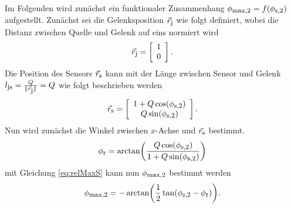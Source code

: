 Im Folgenden wird zunächst ein funktionaler Zusammenhang $\phi_{\textrm{\footnotesize{max,2}}} = f(\phi_{\textrm{\footnotesize{s,2}}})$ aufgestellt. Zunächst sei die Gelenksposition $\vec{r}_{\textrm{\footnotesize{j}}}$ wie folgt definiert, wobei die Distanz zwischen Quelle und Gelenk auf eins normiert wird 
	\begin{equation}
		\vec{r}_{\textrm{\footnotesize{j}}} = \left[\begin{array}{c} 1\\ 0 \end{array}\right] .
	\end{equation}
	Die Position des Sensors $\vec{r}_{\textrm{\footnotesize{s}}}$ kann mit der Länge zwischen Sensor und Gelenk $l_{\textrm{\footnotesize{js}}} = \frac{Q}{\|\vec{r}_{\textrm{\footnotesize{j}}}\|}=Q$ wie folgt beschrieben werden
	\begin{equation}
		\vec{r}_{\textrm{\footnotesize{s}}} = \left[\begin{array}{c} 1+Q\cos(\phi_{\textrm{\footnotesize{s,2}}})\\ Q\sin(\phi_{\textrm{\footnotesize{s,2}}}) \end{array}\right] .
	\end{equation}
	Nun wird zunächst die Winkel zwischen $x$-Achse und $\vec{r}_{\textrm{\footnotesize{s}}}$ bestimmt.
	\begin{equation}
		\phi_{\textrm{\footnotesize{r}}} = \arctan\biggl(\frac{Q\cos(\phi_{\textrm{\footnotesize{s,2}}})}{1+Q\sin(\phi_{\textrm{\footnotesize{s,2}}})}\biggr)
	\end{equation}
	mit Gleichung \ref{eq:relMaxS} kann nun $\phi_{\textrm{\footnotesize{max,2}}}$ bestimmt werden 
	\begin{equation}
		\phi_{\textrm{\footnotesize{max,2}}} = -\arctan\biggl(\frac{1}{2} \tan(\phi_{\textrm{\footnotesize{s,2}}} - \phi_{\textrm{\footnotesize{r}}} )\biggr).
        \label{eq:uniqness_Value_2}
	\end{equation}
	
